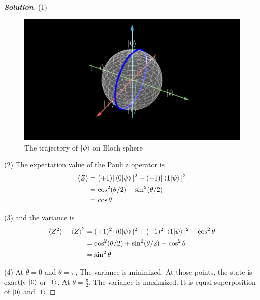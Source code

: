 \documentclass[a4paper,11pt]{article}
\newenvironment{solution}[1]
  {\renewcommand\qedsymbol{$\square$}\begin{proof}[\textbf{Solution#1}]}
  {\end{proof}}
\begin{document}
\begin{solution}{}
    (1)
    \begin{figure}[h!]
        \centering
        \includegraphics[width=0.5\linewidth]{ExampleSphere_ManimCE_v0.19.0.png}
        \caption{The trajectory of $\ket\psi$ on Bloch sphere}
        \label{fig:bloch}
    \end{figure}
    
    (2) The expectation value of the Pauli z operator is
    \begin{align}
        \braket{Z} &= (+1)|\braket{0|\psi}|^2 + (-1)|\braket{1|\psi}|^2\\
        &=\cos^2(\theta/2) - \sin^2(\theta/2) \\
        &=\cos\theta
    \end{align}

    (3) and the variance is
    \begin{align}
        \braket{Z^2} - \braket{Z}^2&= (+1)^2|\braket{0|\psi}|^2 + (-1)^2|\braket{1|\psi}|^2 - \cos^2\theta\\
        &=\cos^2(\theta/2) + \sin^2(\theta/2) - \cos^2\theta\\
        &=\sin^2\theta
    \end{align}

    (4) At $\theta = 0$ and $\theta = \pi$, The variance is minimized. At those points,  the state is exactly $\ket{0}$ or $\ket{1}$. At $\theta = \frac{\pi}{2}$, The variance is maximized. It is equal superposition of $\ket{0}$ and $\ket{1}$
    
    
\end{solution}
\end{document}
